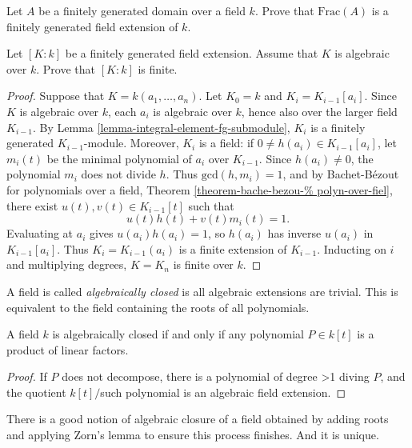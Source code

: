 \begin{exercise}
\label{exercise-frac-fg-algebra-fg-field}
Let $A$ be a finitely generated domain over
a field $k$.
Prove that $\text{Frac}(A)$ is a finitely
generated field extension of $k$.
\end{exercise}

\begin{exercise}
\label{exercise-fg-algebraic-field-%
extension-finite}
Let $[K:k]$ be a finitely generated field
extension.
Assume that $K$ is algebraic over $k$.
Prove that $[K:k]$ is finite.
\end{exercise}

\begin{proof}
Suppose that $K=k(a_1,\ldots,a_n)$.
Let $K_0=k$ and
$K_i=K_{i-1}[a_i]$.
Since $K$ is algebraic over $k$, each $a_i$
is algebraic over $k$, hence also over the
larger field $K_{i-1}$.
By Lemma
\ref{lemma-integral-element-fg-submodule},
$K_i$ is a finitely generated
$K_{i-1}$-module.
Moreover, $K_i$ is a field: if
$0\neq h(a_i)\in K_{i-1}[a_i]$, let $m_i(t)$
be the minimal polynomial of $a_i$ over
$K_{i-1}$.
Since $h(a_i)\neq 0$, the polynomial $m_i$
does not divide $h$.
Thus $\text{gcd}(h,m_i)=1$, and by
Bachet-Bézout for polynomials over a field,
Theorem
\ref{theorem-bache-bezou-%
polyn-over-fiel},
there exist $u(t),v(t)\in K_{i-1}[t]$ such
that
$$
u(t)h(t)+v(t)m_i(t)=1.
$$
Evaluating at $a_i$ gives
$u(a_i)h(a_i)=1$, so $h(a_i)$ has inverse
$u(a_i)$ in $K_{i-1}[a_i]$.
Thus $K_i=K_{i-1}(a_i)$ is a finite extension
of $K_{i-1}$.
Inducting on $i$ and multiplying degrees,
$K=K_n$ is finite over $k$.
\end{proof}

\noindent
A field is called {\it algebraically closed}
is all algebraic extensions are trivial.
This is equivalent to the field containing
the roots of all polynomials.

\begin{lemma}
\label{lemma-algeb-close-iff-facto-polyn}
A field $k$ is algebraically closed if and
only if
any polynomial $P \in k[t]$ is a product of
linear factors.
\end{lemma}

\begin{proof}
If $P$ does not decompose,
there is a polynomial of degree >1 diving
$P$,
and the quotient $k[t]/$such polynomial is an
algebraic field extension.
\end{proof}

\noindent
There is a good notion of algebraic closure
of a field
obtained by adding roots and applying Zorn's
lemma
to ensure this process finishes. And it is
unique.

